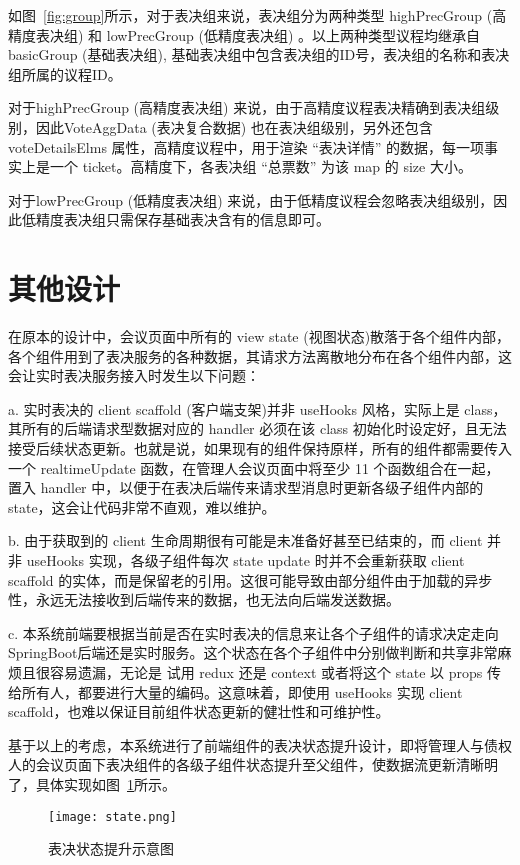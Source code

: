   如图~\ref{fig:group}所示，对于表决组来说，表决组分为两种类型 highPrecGroup (高精度表决组) 和 lowPrecGroup (低精度表决组) 。以上两种类型议程均继承自 basicGroup (基础表决组), 基础表决组中包含表决组的ID号，表决组的名称和表决组所属的议程ID。

  对于highPrecGroup (高精度表决组) 来说，由于高精度议程表决精确到表决组级别，因此VoteAggData (表决复合数据) 也在表决组级别，另外还包含 voteDetailsElms 属性，高精度议程中，用于渲染 “表决详情” 的数据，每一项事实上是一个 ticket。高精度下，各表决组 “总票数” 为该 map 的 size 大小。

  对于lowPrecGroup (低精度表决组) 来说，由于低精度议程会忽略表决组级别，因此低精度表决组只需保存基础表决含有的信息即可。

  \section{其他设计}
  在原本的设计中，会议页面中所有的 view state (视图状态)散落于各个组件内部，各个组件用到了表决服务的各种数据，其请求方法离散地分布在各个组件内部，这会让实时表决服务接入时发生以下问题：

  \quad{}a. 实时表决的 client scaffold (客户端支架)并非 useHooks 风格，实际上是 class，其所有的后端请求型数据对应的 handler 必须在该 class 初始化时设定好，且无法接受后续状态更新。也就是说，如果现有的组件保持原样，所有的组件都需要传入一个 realtimeUpdate 函数，在管理人会议页面中将至少 11 个函数组合在一起，置入 handler 中，以便于在表决后端传来请求型消息时更新各级子组件内部的 state，这会让代码非常不直观，难以维护。

  \quad{}b. 由于获取到的 client 生命周期很有可能是未准备好甚至已结束的，而 client 并非 useHooks 实现，各级子组件每次 state update 时并不会重新获取 client scaffold 的实体，而是保留老的引用。这很可能导致由部分组件由于加载的异步性，永远无法接收到后端传来的数据，也无法向后端发送数据。

  \quad{}c. 本系统前端要根据当前是否在实时表决的信息来让各个子组件的请求决定走向 SpringBoot后端还是实时服务。这个状态在各个子组件中分别做判断和共享非常麻烦且很容易遗漏，无论是 试用 redux 还是 context 或者将这个 state 以 props 传给所有人，都要进行大量的编码。这意味着，即使用 useHooks 实现 client scaffold，也难以保证目前组件状态更新的健壮性和可维护性。

  基于以上的考虑，本系统进行了前端组件的表决状态提升设计，即将管理人与债权人的会议页面下表决组件的各级子组件状态提升至父组件，使数据流更新清晰明了，具体实现如图~\ref{fig:state}所示。

  \begin{figure}[!htp]
    \centering
    \texttt{[image: state.png]}
    \caption{表决状态提升示意图}
   \label{fig:state}
  \end{figure}

